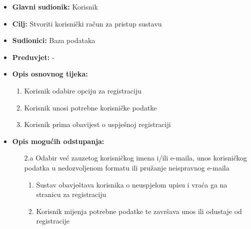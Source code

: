                         \noindent {}
					\begin{itemize}
	
						\item \textbf{Glavni sudionik: }Korisnik
						\item  \textbf{Cilj:} Stvoriti korisnički račun za pristup sustavu
						\item  \textbf{Sudionici:} Baza podataka
						\item  \textbf{Preduvjet:} -
						\item  \textbf{Opis osnovnog tijeka:}
						
						\item[] \begin{enumerate}
							\item Korisnik odabire opciju za registraciju
                                \item Korisnik unosi potrebne korisničke podatke
                                \item Korisnik prima obavijest o uspješnoj registraciji
						\end{enumerate}

                            \item  \textbf{Opis mogućih odstupanja:}
						
						\item[] \begin{enumerate}
	
							\item[2.a] Odabir već zauzetog korisničkog imena i/ili e-maila, unos korisničkog podatka u nedozvoljenom formatu ili pružanje neispravnog e-maila
							\item[] \begin{enumerate}
								
								\item Sustav obavještava korisnika o neuspjelom upisu i vraća ga na stranicu za registraciju
								\item Korisnik mijenja potrebne podatke te završava unos ili odustaje od registracije\\
								
							\end{enumerate}
			
							
						\end{enumerate}
						
					\end{itemize}

